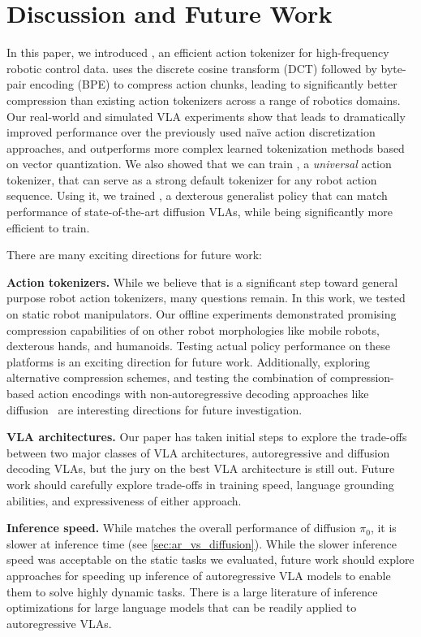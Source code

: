 \section{Discussion and Future Work}
\label{sec:conclusion} 

In this paper, we introduced \ModelAcronym{}, an efficient action tokenizer for high-frequency robotic control data. \ModelAcronym{} uses the discrete cosine transform (DCT) followed by byte-pair encoding (BPE) to compress action chunks, leading to significantly better compression than existing action tokenizers across a range of robotics domains. Our real-world and simulated VLA experiments show that \ModelAcronym{} leads to dramatically improved performance over the previously used na\"{i}ve action discretization approaches, and outperforms more complex learned tokenization methods based on vector quantization. We also showed that we can train \ModelUniversalAcronym{}, a \emph{universal} action tokenizer, that can serve as a strong default tokenizer for any robot action sequence. Using it, we trained \GeneralistModelAcronym, a dexterous generalist policy that can match performance of state-of-the-art diffusion VLAs, while being significantly more efficient to train. 

There are many exciting directions for future work:

\textbf{Action tokenizers.} While we believe that \ModelAcronym{} is a significant step toward general purpose robot action tokenizers, many questions remain. 
In this work, we tested \ModelAcronym{} on static robot manipulators. Our offline experiments demonstrated promising compression capabilities of \ModelUniversalAcronym{} on other robot morphologies like mobile robots, dexterous hands, and humanoids. Testing actual policy performance on these platforms is an exciting direction for future work. Additionally, exploring alternative compression schemes, and testing the combination of compression-based action encodings with non-autoregressive decoding approaches like diffusion~\citep{black2024pi_0} are interesting directions for future investigation.

\textbf{VLA architectures.} 
Our paper has taken initial steps to explore the trade-offs between two major classes of VLA architectures, autoregressive and diffusion decoding VLAs, but the jury on the best VLA architecture is still out. Future work should carefully explore trade-offs in training speed, language grounding abilities, and expressiveness of either approach. 

\textbf{Inference speed.} While \GeneralistModelAcronym{} matches the overall performance of diffusion $\pi_0$, it is slower at inference time (see \cref{sec:ar_vs_diffusion}). While the slower inference speed was acceptable on the static tasks we evaluated, future work should explore approaches for speeding up inference of autoregressive VLA models to enable them to solve highly dynamic tasks. There is a large literature of inference optimizations for large language models that can be readily applied to autoregressive VLAs.


